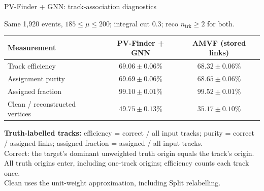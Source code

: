 \documentclass[xcolor=table,aspectratio=169]{beamer}
\newcommand{\ntrk}{\ensuremath{n_\mathrm{trk}}}
\newcommand{\takeaway}[1]{\par\vspace{.65em}{\centering
  \setlength{\fboxsep}{7pt}\colorbox{pennred!5}{\parbox{.94\linewidth}{%
  \centering\small\textcolor{pennred}{#1}}}\par}}
\newcommand{\context}[1]{{\centering\footnotesize\color{black!55}#1\par}\vspace{.65em}}
\begin{document}
\begin{frame}[shrink=5]{PV-Finder + GNN: track-association diagnostics}
    \context{Same 1,920 events, $185\leq\mu\leq200$; integral cut $0.3$; reco $\ntrk\geq2$
        for both.}
    \centering\small\renewcommand{\arraystretch}{1.2}
    \begin{tabular}{lcc}
        \toprule
        Measurement & PV-Finder + GNN & AMVF (stored links)\\
        \midrule
        Track efficiency & $69.06\pm0.06\%$ & $68.32\pm0.06\%$\\
        Assignment purity & $69.69\pm0.06\%$ & $68.65\pm0.06\%$\\
        Assigned fraction & $99.10\pm0.01\%$ & $99.52\pm0.01\%$\\
        \midrule
        Clean / reconstructed vertices & $49.75\pm0.13\%$ & $35.17\pm0.10\%$\\
        \bottomrule
    \end{tabular}
    \par\vspace{.25em}\raggedright\footnotesize
    \textbf{Truth-labelled tracks:} efficiency = correct / all input tracks; purity = correct / assigned
        links; assigned fraction = assigned / all input tracks.\\[.3em]
    Correct: the target's dominant unweighted truth origin equals the track's origin. All truth origins enter,
        including one-track origins; efficiency counts each track once.\\[.3em]
    Clean uses the unit-weight approximation, including Split relabelling.
    \takeaway{Full-pileup GNN: $+0.75\pm0.02$\ efficiency points and $+1.05\pm0.02$\ purity points over AMVF.}
\end{frame}
\end{document}
